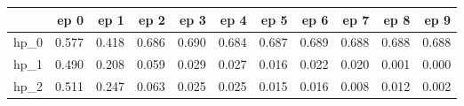 \begin{tabular}{lrrrrrrrrrr}
\toprule
{} &   ep 0 &   ep 1 &   ep 2 &   ep 3 &   ep 4 &   ep 5 &   ep 6 &   ep 7 &   ep 8 &   ep 9 \\
\midrule
hp\_0 &  0.577 &  0.418 &  0.686 &  0.690 &  0.684 &  0.687 &  0.689 &  0.688 &  0.688 &  0.688 \\
hp\_1 &  0.490 &  0.208 &  0.059 &  0.029 &  0.027 &  0.016 &  0.022 &  0.020 &  0.001 &  0.000 \\
hp\_2 &  0.511 &  0.247 &  0.063 &  0.025 &  0.025 &  0.015 &  0.016 &  0.008 &  0.012 &  0.002 \\
\bottomrule
\end{tabular}
